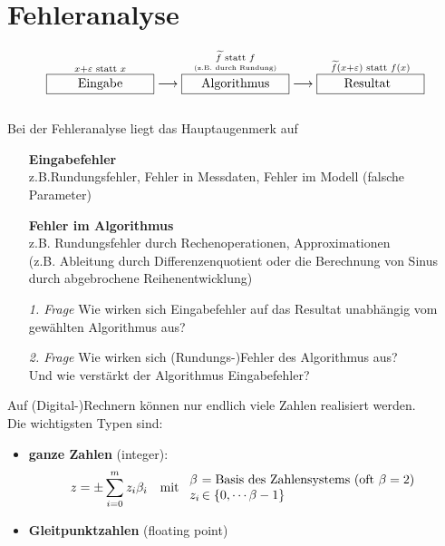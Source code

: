 %
%
%
%


\chapter{Fehleranalyse} \label{3}
\begin{align*}
  \overset{x+\varepsilon \text{ statt } x}{\framebox[3cm]{Eingabe}} \longrightarrow 
  \overset{\underset{\text{\tiny (z.B. durch Rundung)}}{\widetilde{f} \text{ statt } f}}{\framebox[3cm]{Algorithmus}} \longrightarrow
  \overset{\widetilde{f}(x+\varepsilon) \text{ statt } f(x)}{\framebox[3cm]{Resultat\phantom{g}}}
\end{align*}\\

Bei der Fehleranalyse liegt das Hauptaugenmerk auf
\begin{itemize}
\item[] \textbf{Eingabefehler}\\ z.B.Rundungsfehler, Fehler in Messdaten, Fehler im Modell (falsche Parameter)
\item[] \textbf{Fehler im Algorithmus} \\ z.B. Rundungsfehler durch Rechenoperationen, Approximationen \\
  (z.B. Ableitung durch Differenzenquotient oder die Berechnung von Sinus durch abgebrochene Reihenentwicklung)
  \\
\item[\textit{1. Frage}] Wie wirken sich Eingabefehler auf das Resultat unabhängig vom gewählten Algorithmus aus?
\item[\textit{2. Frage}]Wie wirken sich (Rundungs-)Fehler des Algorithmus aus?\\
  Und wie verstärkt der Algorithmus Eingabefehler?
\end{itemize}


 \label{3.1}  
Auf (Digital-)Rechnern können nur endlich viele Zahlen realisiert werden. \\
Die wichtigsten Typen sind: 
\begin{itemize}
\item \textbf{ganze Zahlen}  (integer):
  \begin{align*}
    z&=\pm \sum_{i=0}^{m}z_i\beta_i & \text{mit }
                                      \begin{array}{l@{\,}l}
                                        \beta &= \text{Basis des Zahlensystems (oft $\beta=2$)} \\
                                        z_i &\in \{0, \cdots \beta-1\}
                                      \end{array}
  \end{align*}
\item \textbf{Gleitpunktzahlen} (floating point) 
\end{itemize}

